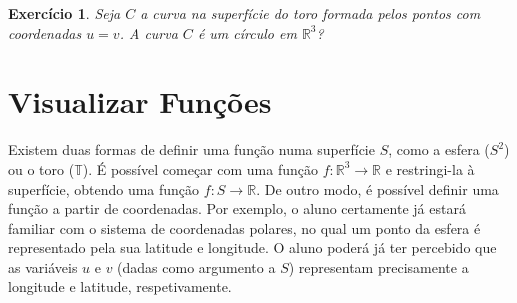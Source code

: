 \documentclass{article}
\newtheorem{ex}{Exercício}
\newcommand{\R}{\mathbb{R}}
\newcommand{\T}{\mathbb{T}}
\begin{document}
\begin{ex}
Seja $C$ a curva na superfície do toro formada pelos pontos com coordenadas $u = v$. A curva $C$ é um círculo em $\R^3$?
\end{ex}

\section{Visualizar Funções}

Existem duas formas de definir uma função numa superfície $S$, como a esfera ($S^2$) ou o toro ($\T$). É possível começar com uma função $f \colon \R^3 \to \R$ e restringi-la à superfície, obtendo uma função $f \colon S \to \R$. De outro modo, é possível definir uma função a partir de coordenadas. Por exemplo, o aluno certamente já estará familiar com o sistema de coordenadas polares, no qual um ponto da esfera é representado pela sua latitude e longitude. O aluno poderá já ter percebido que as variáveis $u$ e $v$ (dadas como argumento a $S$) representam precisamente a longitude e latitude, respetivamente.
\end{document}
